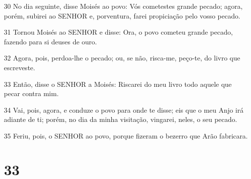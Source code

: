 \par 30 No dia seguinte, disse Moisés ao povo: Vós cometestes grande pecado; agora, porém, subirei ao SENHOR e, porventura, farei propiciação pelo vosso pecado.
\par 31 Tornou Moisés ao SENHOR e disse: Ora, o povo cometeu grande pecado, fazendo para si deuses de ouro.
\par 32 Agora, pois, perdoa-lhe o pecado; ou, se não, risca-me, peço-te, do livro que escreveste.
\par 33 Então, disse o SENHOR a Moisés: Riscarei do meu livro todo aquele que pecar contra mim.
\par 34 Vai, pois, agora, e conduze o povo para onde te disse; eis que o meu Anjo irá adiante de ti; porém, no dia da minha visitação, vingarei, neles, o seu pecado.
\par 35 Feriu, pois, o SENHOR ao povo, porque fizeram o bezerro que Arão fabricara.

\chapter{33}


